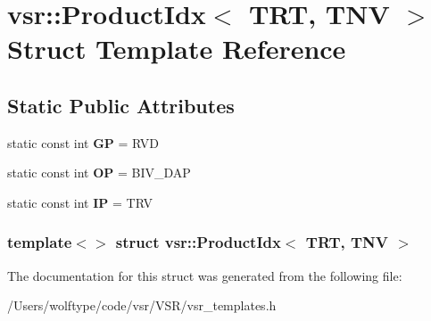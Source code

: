 \hypertarget{structvsr_1_1_product_idx_3_01_t_r_t_00_01_t_n_v_01_4}{\section{vsr\-:\-:Product\-Idx$<$ T\-R\-T, T\-N\-V $>$ Struct Template Reference}
\label{structvsr_1_1_product_idx_3_01_t_r_t_00_01_t_n_v_01_4}
}
\subsection*{Static Public Attributes}
\begin{DoxyCompactItemize}
\item 
\hypertarget{structvsr_1_1_product_idx_3_01_t_r_t_00_01_t_n_v_01_4_a55b6ff4a3d0da2419cdc22f41b128ded}{static const int {\bfseries G\-P} = R\-V\-D}\label{structvsr_1_1_product_idx_3_01_t_r_t_00_01_t_n_v_01_4_a55b6ff4a3d0da2419cdc22f41b128ded}

\item 
\hypertarget{structvsr_1_1_product_idx_3_01_t_r_t_00_01_t_n_v_01_4_a0d1bd188862ee5f8ba5789395616f655}{static const int {\bfseries O\-P} = B\-I\-V\-\_\-\-D\-A\-P}\label{structvsr_1_1_product_idx_3_01_t_r_t_00_01_t_n_v_01_4_a0d1bd188862ee5f8ba5789395616f655}

\item 
\hypertarget{structvsr_1_1_product_idx_3_01_t_r_t_00_01_t_n_v_01_4_a97c272a1a98d9933394d889e411d0909}{static const int {\bfseries I\-P} = T\-R\-V}\label{structvsr_1_1_product_idx_3_01_t_r_t_00_01_t_n_v_01_4_a97c272a1a98d9933394d889e411d0909}

\end{DoxyCompactItemize}
\subsubsection*{template$<$$>$ struct vsr\-::\-Product\-Idx$<$ T\-R\-T, T\-N\-V $>$}



The documentation for this struct was generated from the following file\-:\begin{DoxyCompactItemize}
\item 
/\-Users/wolftype/code/vsr/\-V\-S\-R/vsr\-\_\-templates.\-h\end{DoxyCompactItemize}
